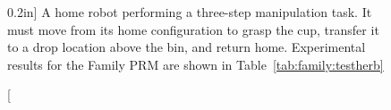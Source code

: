 \begin{figure}[t]
   \centering
   

   \caption[][0.2in]{
     A home robot performing a three-step manipulation task.
     It must move from its home configuration
     to grasp the cup,
     transfer it to a drop location above the bin,
     and return home.
     Experimental results for the Family PRM
     are shown in Table~\ref{tab:family:testherb}}
   \label{fig:family:testherb-problem}
\end{figure}

